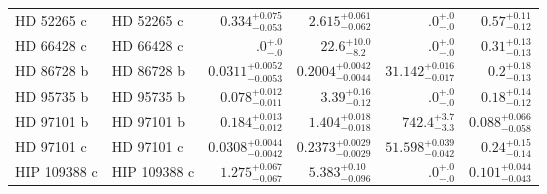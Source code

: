 \begin{longtable*}{llrrrr}
HD 52265 c & HD 52265 c & $0.334^{+0.075}_{-0.053}$ & $2.615^{+0.061}_{-0.062}$ & $.0^{+.0}_{-.0}$ & $0.57^{+0.11}_{-0.12}$ \\ 
HD 66428 c & HD 66428 c & $.0^{+.0}_{-.0}$ & $22.6^{+10.0}_{-8.2}$ & $.0^{+.0}_{-.0}$ & $0.31^{+0.13}_{-0.13}$ \\ 
HD 86728 b & HD 86728 b & $0.0311^{+0.0052}_{-0.0053}$ & $0.2004^{+0.0042}_{-0.0044}$ & $31.142^{+0.016}_{-0.017}$ & $0.2^{+0.18}_{-0.13}$ \\ 
HD 95735 b & HD 95735 b & $0.078^{+0.012}_{-0.011}$ & $3.39^{+0.16}_{-0.12}$ & $.0^{+.0}_{-.0}$ & $0.18^{+0.14}_{-0.12}$ \\ 
HD 97101 b & HD 97101 b & $0.184^{+0.013}_{-0.012}$ & $1.404^{+0.018}_{-0.018}$ & $742.4^{+3.7}_{-3.3}$ & $0.088^{+0.066}_{-0.058}$ \\ 
HD 97101 c & HD 97101 c & $0.0308^{+0.0044}_{-0.0042}$ & $0.2373^{+0.0029}_{-0.0029}$ & $51.598^{+0.039}_{-0.042}$ & $0.24^{+0.15}_{-0.14}$ \\ 
HIP 109388 c & HIP 109388 c & $1.275^{+0.067}_{-0.067}$ & $5.383^{+0.10}_{-0.096}$ & $.0^{+.0}_{-.0}$ & $0.101^{+0.044}_{-0.043}$ \\ 
\bottomrule 
\end{longtable*} 
